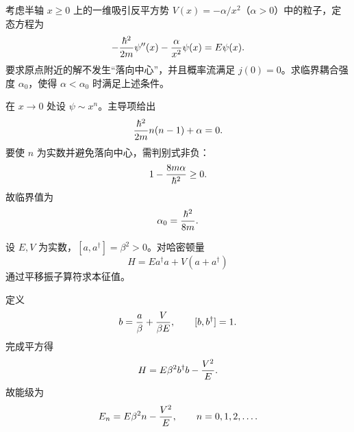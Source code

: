 \begin{question}
考虑半轴 $x\ge0$ 上的一维吸引反平方势 $V(x)=-\alpha/x^2$（$\alpha>0$）中的粒子，定态方程为
\[
  -{\hbar^2\over2m}\psi''(x)-{\alpha\over x^2}\psi(x)=E\psi(x).
\]
要求原点附近的解不发生“落向中心”，并且概率流满足 $j(0)=0$。求临界耦合强度 $\alpha_0$，使得 $\alpha<\alpha_0$ 时满足上述条件。
\begin{solution}
在 $x\to0$ 处设 $\psi\sim x^n$。主导项给出
\[
  {\hbar^2\over2m}n(n-1)+\alpha=0.
\]
要使 $n$ 为实数并避免落向中心，需判别式非负：
\[
  1-{8m\alpha\over\hbar^2}\ge0.
\]
故临界值为
\[
  \alpha_0={\hbar^2\over8m}.
\]
\end{solution}
\end{question}

\begin{question}
设 $E,V$ 为实数，$[a,a^\dagger]=\beta^2>0$。对哈密顿量
\[
  H=E a^\dagger a+V(a+a^\dagger)
\]
通过平移振子算符求本征值。
\begin{solution}
定义
\[
  b={a\over\beta}+{V\over\beta E},
  \qquad [b,b^\dagger]=1.
\]
完成平方得
\[
  H=E\beta^2 b^\dagger b-{V^2\over E}.
\]
故能级为
\[
  E_n=E\beta^2 n-{V^2\over E},
  \qquad n=0,1,2,\ldots .
\]
\end{solution}
\end{question}
